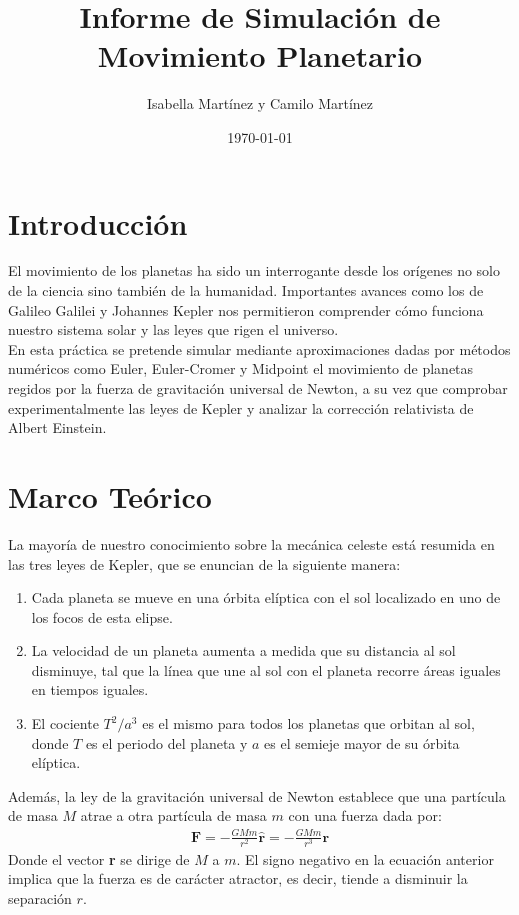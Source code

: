\documentclass[twoside]{article}
\title{Informe de Simulación de Movimiento Planetario}
\author{Isabella Martínez y Camilo Martínez}
\date{\today}
\begin{document}
\maketitle
\thispagestyle{fancy}

\begin{multicols}{2}
	\section{Introducción}
	El movimiento de los planetas ha sido un interrogante desde los orígenes no solo de la ciencia sino también de la humanidad. Importantes avances como los de Galileo Galilei y Johannes Kepler nos permitieron comprender cómo funciona nuestro sistema solar y las leyes que rigen el universo.\\
	
	En esta práctica se pretende simular mediante aproximaciones dadas por métodos numéricos como Euler, Euler-Cromer y Midpoint el movimiento de planetas regidos por la fuerza de gravitación universal de Newton, a su vez que comprobar experimentalmente las leyes de Kepler y analizar la corrección relativista de Albert Einstein.
	
	\section{Marco Teórico}
	La mayoría de nuestro conocimiento sobre la mecánica celeste está resumida en las tres leyes de Kepler, que se enuncian de la siguiente manera:
	
	\begin{enumerate}
		\item Cada planeta se mueve en una órbita elíptica con el sol localizado en uno de los focos de esta elipse.
		\item La velocidad de un planeta aumenta a medida que su distancia al sol disminuye, tal que la línea que une al sol con el planeta recorre áreas iguales en tiempos iguales.
		\item El cociente $ T^{2}/a^{3} $ es el mismo para todos los planetas que orbitan al sol, donde $ T $ es el periodo del planeta y $ a $ es el semieje mayor de su órbita elíptica.
	\end{enumerate}

	Además, la ley de la gravitación universal de Newton establece que una partícula de masa $ M $ atrae a otra partícula de masa $ m $ con una fuerza dada por:
	\begin{align}
		\textbf{F} = -\frac{GMm}{r^{2}}\hat{\textbf{r}} = -\frac{GMm}{r^3}\textbf{r}
	\end{align}
	Donde el vector \textbf{r} se dirige de $ M $ a $ m $. El signo negativo en la ecuación anterior implica que la fuerza es de carácter atractor, es decir, tiende a disminuir la separación $ r $.\\
	

\end{multicols}
\end{document}
